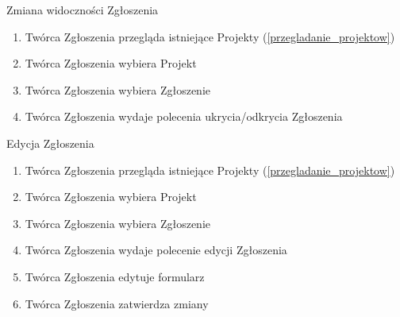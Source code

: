 \begin{usecase}{Zmiana widoczności Zgłoszenia}
	\begin{enumerate}
    \item Twórca Zgłoszenia przegląda istniejące Projekty (\ref{przegladanie_projektow})
    \item Twórca Zgłoszenia wybiera Projekt
    \item Twórca Zgłoszenia wybiera Zgłoszenie
    \item Twórca Zgłoszenia wydaje polecenia ukrycia/odkrycia Zgłoszenia
	\end{enumerate}
\end{usecase}

\begin{usecase}{Edycja Zgłoszenia}
\label{edycja_zgloszenia}
	\begin{enumerate}
	\item Twórca Zgłoszenia przegląda istniejące Projekty (\ref{przegladanie_projektow})
    \item Twórca Zgłoszenia wybiera Projekt
    \item Twórca Zgłoszenia wybiera Zgłoszenie
    \item Twórca Zgłoszenia wydaje polecenie edycji Zgłoszenia
    \item Twórca Zgłoszenia edytuje formularz
    \item Twórca Zgłoszenia zatwierdza zmiany
	\end{enumerate}
\end{usecase}

